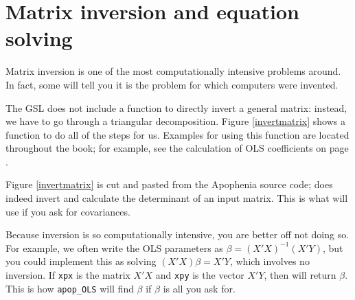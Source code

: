 
\section{Matrix inversion and equation solving}  
Matrix inversion is one of the most computationally intensive problems
around. In fact, some will tell you it is the problem for which computers were invented.

The GSL does not include a function to directly invert a general matrix:
instead, we have to go through a triangular decomposition. Figure
\ref{invertmatrix} shows a function to do all of the steps for us.
Examples for using this function are located throughout the book; for
example, see the calculation of OLS coefficients on page \pageref{ols}.


Figure \ref{invertmatrix} is cut and pasted from the Apophenia source
code;  does indeed invert and calculate the
determinant of an input matrix. This is what  will use if
you ask for covariances.

Because inversion is so computationally intensive, you are better off
not doing so.  For example, we often write the OLS parameters as $\beta
=(X'X)^{-1}(X'Y)$, but you could implement this as solving
$(X'X)\beta = X'Y$, which involves no inversion. If {\tt xpx} is the
matrix $X'X$ and {\tt xpy} is the vector $X'Y$, then 
 will
return $\beta$. This is how {\tt apop\_OLS} will find $\beta$ if $\beta$
is all you ask for.

